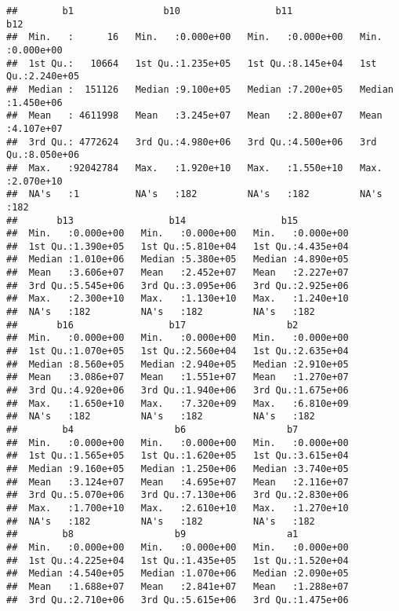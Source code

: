 \documentclass[
]{article}
\begin{document}
\begin{verbatim}
##        b1                b10                 b11                 b12           
##  Min.   :      16   Min.   :0.000e+00   Min.   :0.000e+00   Min.   :0.000e+00  
##  1st Qu.:   10664   1st Qu.:1.235e+05   1st Qu.:8.145e+04   1st Qu.:2.240e+05  
##  Median :  151126   Median :9.100e+05   Median :7.200e+05   Median :1.450e+06  
##  Mean   : 4611998   Mean   :3.245e+07   Mean   :2.800e+07   Mean   :4.107e+07  
##  3rd Qu.: 4772624   3rd Qu.:4.980e+06   3rd Qu.:4.500e+06   3rd Qu.:8.050e+06  
##  Max.   :92042784   Max.   :1.920e+10   Max.   :1.550e+10   Max.   :2.070e+10  
##  NA's   :1          NA's   :182         NA's   :182         NA's   :182        
##       b13                 b14                 b15           
##  Min.   :0.000e+00   Min.   :0.000e+00   Min.   :0.000e+00  
##  1st Qu.:1.390e+05   1st Qu.:5.810e+04   1st Qu.:4.435e+04  
##  Median :1.010e+06   Median :5.380e+05   Median :4.890e+05  
##  Mean   :3.606e+07   Mean   :2.452e+07   Mean   :2.227e+07  
##  3rd Qu.:5.545e+06   3rd Qu.:3.095e+06   3rd Qu.:2.925e+06  
##  Max.   :2.300e+10   Max.   :1.130e+10   Max.   :1.240e+10  
##  NA's   :182         NA's   :182         NA's   :182        
##       b16                 b17                  b2           
##  Min.   :0.000e+00   Min.   :0.000e+00   Min.   :0.000e+00  
##  1st Qu.:1.070e+05   1st Qu.:2.560e+04   1st Qu.:2.635e+04  
##  Median :8.560e+05   Median :2.940e+05   Median :2.910e+05  
##  Mean   :3.086e+07   Mean   :1.551e+07   Mean   :1.270e+07  
##  3rd Qu.:4.920e+06   3rd Qu.:1.940e+06   3rd Qu.:1.675e+06  
##  Max.   :1.650e+10   Max.   :7.320e+09   Max.   :6.810e+09  
##  NA's   :182         NA's   :182         NA's   :182        
##        b4                  b6                  b7           
##  Min.   :0.000e+00   Min.   :0.000e+00   Min.   :0.000e+00  
##  1st Qu.:1.565e+05   1st Qu.:1.620e+05   1st Qu.:3.615e+04  
##  Median :9.160e+05   Median :1.250e+06   Median :3.740e+05  
##  Mean   :3.124e+07   Mean   :4.695e+07   Mean   :2.116e+07  
##  3rd Qu.:5.070e+06   3rd Qu.:7.130e+06   3rd Qu.:2.830e+06  
##  Max.   :1.700e+10   Max.   :2.610e+10   Max.   :1.270e+10  
##  NA's   :182         NA's   :182         NA's   :182        
##        b8                  b9                  a1           
##  Min.   :0.000e+00   Min.   :0.000e+00   Min.   :0.000e+00  
##  1st Qu.:4.225e+04   1st Qu.:1.435e+05   1st Qu.:1.520e+04  
##  Median :4.540e+05   Median :1.070e+06   Median :2.090e+05  
##  Mean   :1.688e+07   Mean   :2.841e+07   Mean   :1.288e+07  
##  3rd Qu.:2.710e+06   3rd Qu.:5.615e+06   3rd Qu.:1.475e+06  

\end{verbatim}
\end{document}
